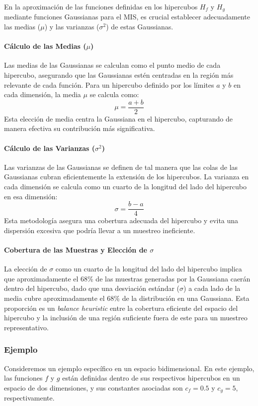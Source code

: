 \documentclass{article}
\begin{document}
En la aproximación de las funciones definidas en los hipercubos \( H_f \) y \( H_g \) mediante funciones Gaussianas para el MIS, es crucial establecer adecuadamente las medias (\( \mu \)) y las varianzas (\( \sigma^2 \)) de estas Gaussianas.

\paragraph{Cálculo de las Medias (\( \mu \))}
Las medias de las Gaussianas se calculan como el punto medio de cada hipercubo, asegurando que las Gaussianas estén centradas en la región más relevante de cada función. Para un hipercubo definido por los límites \( a \) y \( b \) en cada dimensión, la media \( \mu \) se calcula como:
$$
    \mu = \frac{a + b}{2}
$$
Esta elección de media centra la Gaussiana en el hipercubo, capturando de manera efectiva su contribución más significativa.

\paragraph{Cálculo de las Varianzas (\( \sigma^2 \))}
Las varianzas de las Gaussianas se definen de tal manera que las colas de las Gaussianas cubran eficientemente la extensión de los hipercubos. La varianza en cada dimensión se calcula como un cuarto de la longitud del lado del hipercubo en esa dimensión:
$$
    \sigma = \frac{b - a}{4}
$$
Esta metodología asegura una cobertura adecuada del hipercubo y evita una dispersión excesiva que podría llevar a un muestreo ineficiente.

\paragraph{Cobertura de las Muestras y Elección de \( \sigma \)}
La elección de \( \sigma \) como un cuarto de la longitud del lado del hipercubo implica que aproximadamente el 68\% de las muestras generadas por la Gaussiana caerán dentro del hipercubo, dado que una desviación estándar (\( \sigma \)) a cada lado de la media cubre aproximadamente el 68\% de la distribución en una Gaussiana. Esta proporción es un \textit{balance heuristic} entre la cobertura eficiente del espacio del hipercubo y la inclusión de una región suficiente fuera de este para un muestreo representativo.

\subsubsection{Ejemplo}
Consideremos un ejemplo específico en un espacio bidimensional. En este ejemplo, las funciones \( f \) y \( g \) están definidas dentro de sus respectivos hipercubos en un espacio de dos dimensiones, y sus constantes asociadas son \( c_f = 0.5 \) y \( c_g = 5 \), respectivamente.
\end{document}
